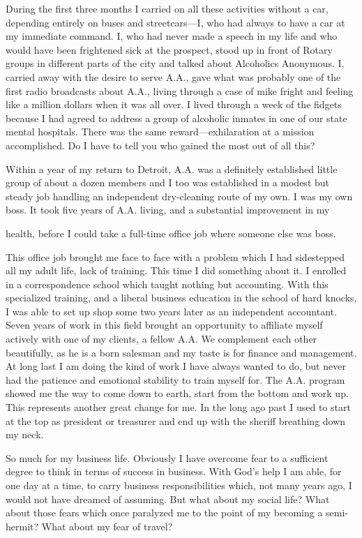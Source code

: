 During the first three months I carried on all these activities without a car, depending entirely on buses and streetcars—I, who had always to have a car at my immediate command. I, who had never made a speech in my life and who would have been frightened sick at the prospect, stood up in front of Rotary groups in different parts of the city and talked about Alcoholics Anonymous. I, carried away with the desire to serve A.A., gave what was probably one of the first radio broadcasts about A.A., living through a case of mike fright and feeling like a million dollars when it was all over. I lived through a week of the fidgets because I had agreed to address a group of alcoholic inmates in one of our state mental hospitals. There was the same reward—exhilaration at a mission accomplished. Do I have to tell you who gained the most out of all this?

Within a year of my return to Detroit, A.A. was a definitely established little group of about a dozen members and I too was established in a modest but steady job handling an independent dry-cleaning route of my own. I was my own boss. It took five years of A.A. living, and a substantial improvement in my

health, before I could take a full-time office job where someone else was boss.

This office job brought me face to face with a problem which I had sidestepped all my adult life, lack of training. This time I did something about it. I enrolled in a correspondence school which taught nothing but accounting. With this specialized training, and a liberal business education in the school of hard knocks, I was able to set up shop some two years later as an independent accountant. Seven years of work in this field brought an opportunity to affiliate myself actively with one of my clients, a fellow A.A. We complement each other beautifully, as he is a born salesman and my taste is for finance and management. At long last I am doing the kind of work I have always wanted to do, but never had the patience and emotional stability to train myself for. The A.A. program showed me the way to come down to earth, start from the bottom and work up. This represents another great change for me. In the long ago past I used to start at the top as president or treasurer and end up with the sheriff breathing down my neck.

So much for my business life. Obviously I have overcome fear to a sufficient degree to think in terms of success in business. With God’s help I am able, for one day at a time, to carry business responsibilities which, not many years ago, I would not have dreamed of assuming. But what about my social life? What about those fears which once paralyzed me to the point of my becoming a semi-hermit? What about my fear of travel?

